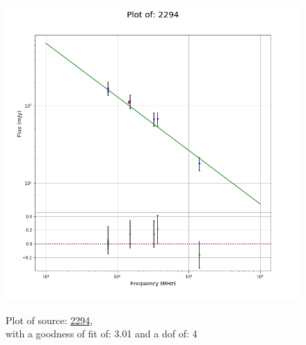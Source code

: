 \documentclass{article}
\begin{document}
\begin{figure}[H]
    \centering
    \begin{minipage}{.5\textwidth}
        \centering
        \includegraphics[scale = 0.35]{KmeulenTrap4P23_1hr/1hr2294.png}
        \captionsetup{labelformat=empty}
        \caption{Plot of source: \href{http://banana.transientskp.org/r4/vlo_KmeulenTrap4P23/runningcatalog/2294}{2294},\\with a goodness of fit of: 3.01 and a dof of: 4}
        \addtocounter{figure}{-1}
        \label{KmeulenTrap4P23:1hr:2294:plot}
    \end{minipage}%
    \begin{minipage}{0.5\textwidth}
        \centering


\end{minipage}
\end{figure}
\end{document}

